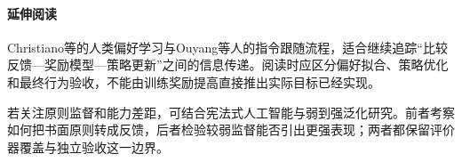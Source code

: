 \paragraph{延伸阅读}

Christiano等的人类偏好学习与Ouyang等人的指令跟随流程，适合继续追踪“比较反馈—奖励模型—策略更新”之间的信息传递。阅读时应区分偏好拟合、策略优化和最终行为验收，不能由训练奖励提高直接推出实际目标已经实现。

若关注原则监督和能力差距，可结合宪法式人工智能与弱到强泛化研究。前者考察如何把书面原则转成反馈，后者检验较弱监督能否引出更强表现；两者都保留评价器覆盖与独立验收这一边界。
